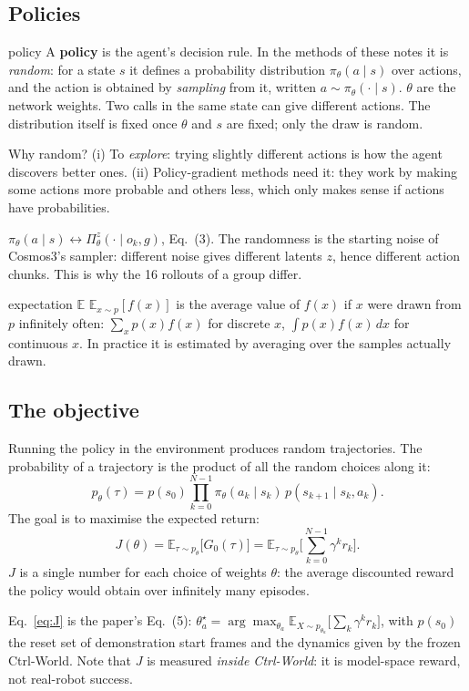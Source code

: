 \documentclass[11pt,a4paper]{article}
\newcommand{\E}{\mathbb{E}}
\begin{document}
\subsection{Policies}
\begin{newc}{policy}
A \textbf{policy} is the agent's decision rule. In the methods of these notes it is \emph{random}: for a state $s$ it defines a probability distribution $\pi_\theta(a\mid s)$ over actions, and the action is obtained by \emph{sampling} from it, written $a\sim\pi_\theta(\cdot\mid s)$. $\theta$ are the network weights. Two calls in the same state can give different actions. The distribution itself is fixed once $\theta$ and $s$ are fixed; only the draw is random.
\end{newc}
Why random? (i) To \emph{explore}: trying slightly different actions is how the agent discovers better ones. (ii) Policy-gradient methods need it: they work by making some actions more probable and others less, which only makes sense if actions have probabilities.

\begin{paperlink}
$\pi_\theta(a\mid s)\leftrightarrow\Pi^z_\theta(\cdot\mid o_k,g)$, Eq.~(3). The randomness is the starting noise of Cosmos3's sampler: different noise gives different latents $z$, hence different action chunks. This is why the 16 rollouts of a group differ.
\end{paperlink}

\begin{newc}{expectation $\E$}
$\E_{x\sim p}[f(x)]$ is the average value of $f(x)$ if $x$ were drawn from $p$ infinitely often: $\sum_xp(x)f(x)$ for discrete $x$, $\int p(x)f(x)\,dx$ for continuous $x$. In practice it is estimated by averaging over the samples actually drawn.
\end{newc}

\subsection{The objective}
Running the policy in the environment produces random trajectories. The probability of a trajectory is the product of all the random choices along it:
\begin{equation}
p_\theta(\tau)=p(s_0)\prod_{k=0}^{N-1}\pi_\theta(a_k\mid s_k)\,p(s_{k+1}\mid s_k,a_k).
\label{eq:ptau}
\end{equation}
The goal is to maximise the expected return:
\begin{equation}
J(\theta)=\E_{\tau\sim p_\theta}\big[G_0(\tau)\big]=\E_{\tau\sim p_\theta}\Big[\sum_{k=0}^{N-1}\gamma^kr_k\Big].
\label{eq:J}
\end{equation}
$J$ is a single number for each choice of weights $\theta$: the average discounted reward the policy would obtain over infinitely many episodes.
\begin{paperlink}
Eq.~\eqref{eq:J} is the paper's Eq.~(5): $\theta_a^\star=\arg\max_{\theta_a}\E_{X\sim p_{\theta_a}}\big[\sum_k\gamma^kr_k\big]$, with $p(s_0)$ the reset set of demonstration start frames and the dynamics given by the frozen Ctrl-World. Note that $J$ is measured \emph{inside Ctrl-World}: it is model-space reward, not real-robot success.
\end{paperlink}
\end{document}
